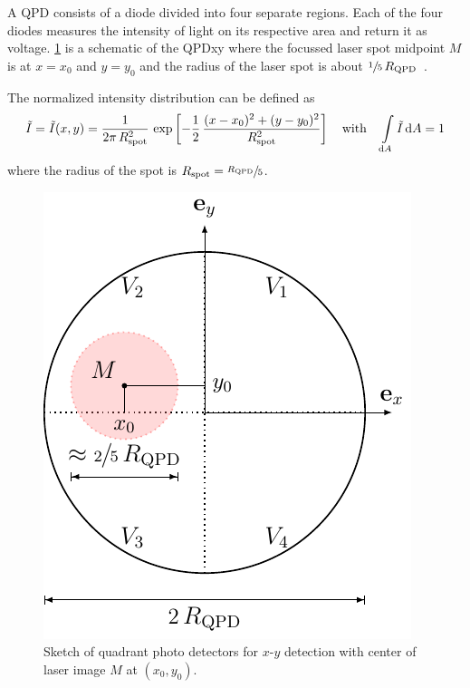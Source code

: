 A QPD consists of a diode divided into four separate regions. Each of the four 
diodes measures the intensity of light on its respective area and return it as 
voltage. \cref{fig:TO-QPD} is a schematic of the QPDxy where the focussed laser 
spot midpoint $M$ is at $x=x_{0}$ and $y=y_{0}$ and the radius of the laser 
spot is about $\sfrac{1}{5}\,R_{\mathrm{QPD}}$~\cite{Lamprecht2017}.

The normalized intensity distribution can be defined as
\begin{equation}
  \tilde{I} = \tilde{I}(x, y) = 
  \frac{1}{2\pi\,R_{\mathrm{spot}}^{2}}\,\exp\left[ 
  -\frac{1}{2}\,\frac{(x-x_{0})^{2} + (y - y_{0})^{2}}{R_{\mathrm{spot}}^{2}} 
\right]
  \quad \text{with}\quad\int\limits_{\dd{A}}\tilde{I}\dd{A} = 1
    \label{eq:TO-intensity}
\end{equation}
where the radius of the spot is $R_{\mathrm{spot}}=\sfrac{R_{\mathrm{QPD}}}{5}$.

\begin{figure}[tbp]
  \centering
  \includegraphics[]{Plots/cache/QPD.pdf}
  \caption{Sketch of quadrant photo detectors for $x$-$y$ detection with center 
  of laser image $M$ at $(x_{0}, y_{0})$.}
  \label{fig:TO-QPD}
\end{figure}

